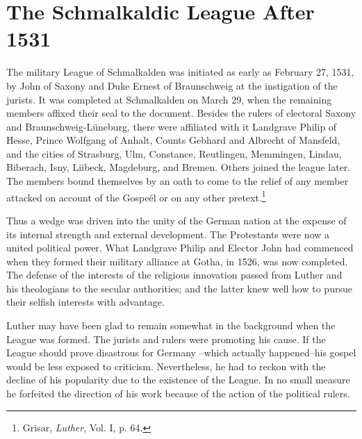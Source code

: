 \section{The Schmalkaldic League After 1531}

The military League of Schmalkalden was initiated as early as
February 27, 1531, by John of Saxony and Duke Ernest of Braunschweig at
the instigation of the jurists. It was completed at Schmalkalden on March
29, when the remaining members affixed their seal
to the document. Besides the rulers of electoral Saxony and Braunschweig-Lüneburg,
there were affiliated with it Landgrave Philip
of Hesse, Prince Wolfgang of Anhalt, Counts Gebhard and Albrecht
of Mansfeld, and the cities of Strasburg, Ulm, Constance, Reutlingen,
Memmingen, Lindau, Biberach, Isny, Liibeck, Magdeburg, and
Bremen. Others joined the league later. The members bound themselves by
an oath to come to the relief of any member attacked on
account of the Gospeél or on any other pretext.\footnote{Grisar, \textit{Luther}, Vol. I, p. 64.}

Thus a wedge was driven into the unity of the German nation at
the expense of its internal strength and external development.
The Protestants were now a united political power. What Landgrave Philip
and Elector John had commenced when they formed
their military alliance at Gotha, in 1526, was now completed. The
defense of the interests of the religious innovation passed from Luther
and his theologians to the secular authorities; and the latter knew well
how to pursue their selfish interests with advantage.

Luther may have been glad to remain somewhat in the background when the
League was formed. The jurists and rulers were
promoting his cause. If the League should prove disastrous for Germany
--which actually happened--his gospel would be less exposed
to criticism. Nevertheless, he had to reckon with the decline of his
popularity due to the existence of the League. In no small measure he
forfeited the direction of his work because of the action of the political
rulers.


